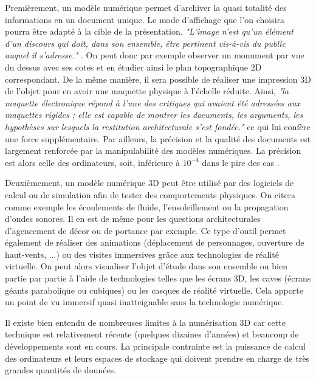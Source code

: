 		Premièrement, un modèle numérique permet d'archiver la quasi totalité des informations en un document unique. Le mode d'affichage que l'on choisira pourra être adapté à la cible de la présentation. \textit{"L’image n’est qu’un élément d’un discours qui doit, dans son ensemble, être pertinent vis-à-vis du public auquel il s’adresse."} \cite[p. 20]{golvin}. On peut donc par exemple observer un monument par vue du dessus avec ses cotes et en étudier ainsi le plan topographique 2D correspondant. De la même manière, il sera possible de réaliser une impression 3D de l'objet pour en avoir une maquette physique à l'échelle réduite. Ainsi, \textit{"la maquette électronique répond à l’une des critiques qui avaient été adressées aux maquettes rigides ; elle est capable de montrer les documents, les arguments, les hypothèses sur lesquels la restitution architecturale s’est fondée."} \cite[p. 26]{golvin} ce qui lui confère une force supplémentaire. Par ailleurs, la précision et la qualité des documents est largement renforcée par la manipulabilité des modèles numériques. La précision est alors celle des ordinateurs, soit, inférieure à $10^{-4}$ dans le pire des cas \cite[Tableau : Valeur pour les unités matérielles standard d'arithmétique à virgule flottante]{precisionmachine}. 
		 
		 Deuxièmement, un modèle numérique 3D peut être utilisé par des logiciels de calcul ou de simulation afin de tester des comportements physiques. On citera comme exemple les écoulements de fluide, l'ensoleillement ou la propagation d'ondes sonores. Il en est de même pour les questions architecturales d'agencement de décor ou de portance par exemple. Ce type d'outil permet également de réaliser des animations (déplacement de personnages, ouverture de haut-vents, ...) ou des visites immersives grâce aux technologies de réalité virtuelle. On peut alors visualiser l'objet d'étude dans son ensemble ou bien partie par partie à l'aide de technologies telles que les écrans 3D, les caves (écrans géants parabolique ou cubiques) ou les casques de réalité virtuelle. Cela apporte un point de vu immersif quasi inatteignable sans la technologie numérique.
		 
Il existe bien entendu de nombreuses limites à la numérisation 3D car cette technique est relativement récente (quelques dizaines d'années) et beaucoup de développements sont en cours. La principale contrainte est la puissance de calcul des ordinateurs et leurs espaces de stockage qui doivent prendre en charge de très grandes quantités de données.

